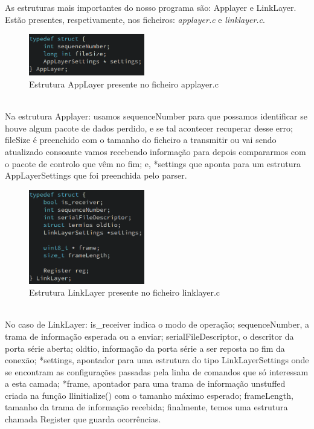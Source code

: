 \documentclass[a4paper]{article}
\begin{document}
As estruturas mais importantes do nosso programa são: Applayer e LinkLayer.
Estão presentes, respetivamente, nos ficheiros: \textit{applayer.c} e
\textit{linklayer.c}.\\
\begin{figure}[h]
\centering
    \includegraphics[width=0.45\textwidth]{applayerStruct.png}
    \caption{Estrutura AppLayer presente no ficheiro applayer.c}
\end{figure} \\
Na estrutura Applayer: usamos sequenceNumber para que
possamos identificar se houve algum pacote de dados perdido, e se tal acontecer
recuperar desse erro; fileSize é preenchido com o tamanho do ficheiro a
transmitir ou vai sendo atualizado consoante vamos recebendo informação para
depois compararmos com o pacote de controlo que vêm no fim; e, *settings que
aponta para um estrutura AppLayerSettings que foi preenchida pelo parser.\\
\begin{figure}[h]
\centering
    \includegraphics[width=0.45\textwidth]{linklayerStruct.png}
    \caption{Estrutura LinkLayer presente no ficheiro linklayer.c}
\end{figure}
\\ No
caso de LinkLayer: is\_receiver indica o modo de operação; sequenceNumber, a
trama de informação esperada ou a enviar; serialFileDescriptor, o descritor da
porta série aberta; oldtio, informação da porta série a ser reposta no fim da
conexão; *settings, apontador para uma estrutura do tipo LinkLayerSettings onde
se encontram as configurações passadas pela linha de comandos que só interessam
a esta camada; *frame, apontador para uma trama de informação unstuffed criada
na função llinitialize() com o tamanho máximo esperado; frameLength, tamanho da
trama de informação recebida; finalmente, temos uma estrutura chamada Register
que guarda ocorrências.
\end{document}
